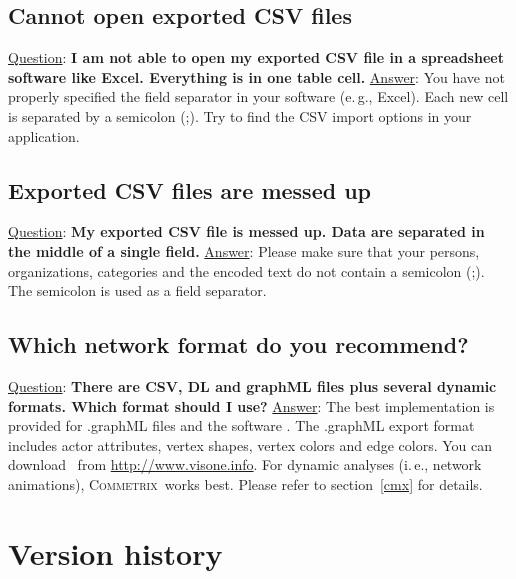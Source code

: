 \documentclass[12pt,a4paper]{scrreprt}
\newcommand{\visone}
{\textsf%
 {\protect\raisebox{.5ex}{\color[rgb]{0.1,0.1,0.1}v}%
  \protect\raisebox{.1ex}{\color[rgb]{0.3,0.3,0.3}i}%
  \protect\raisebox{-.1ex}{\color[rgb]{0.1,0.1,0.1}s}%
  \protect\raisebox{.1ex}{\color[rgb]{0.3,0.3,0.3}o}%
  \protect\raisebox{-.1ex}{\color[rgb]{0.1,0.1,0.1}n}%
  \protect\raisebox{-.4ex}{\color[rgb]{0.3,0.3,0.3}e}%
 }%
}
\newcommand{\commetrix}{\textsc{Commetrix}}
\begin{document}
\section{Cannot open exported CSV files}
\underline{Question}: \textbf{I am not able to open my exported CSV file in a spreadsheet software like Excel. Everything is in one table cell.}
\vspace{0.3cm} \newline
\underline{Answer}: You have not properly specified the field separator in your software (e.\,g., Excel). Each new cell is separated by a semicolon (;). Try to find the CSV import options in your application.

\section{Exported CSV files are messed up}
\underline{Question}: \textbf{My exported CSV file is messed up. Data are separated in the middle of a single field.}
\vspace{0.3cm} \newline
\underline{Answer}: Please make sure that your persons, organizations, categories and the encoded text do not contain a semicolon (;). The semicolon is used as a field separator.

\section{Which network format do you recommend?}
\underline{Question}: \textbf{There are CSV, DL and graphML files plus several dynamic formats. Which format should I use?}
\vspace{0.3cm} \newline
\underline{Answer}: The best implementation is provided for .graphML files and the software \visone. The .graphML export format includes actor attributes, vertex shapes, vertex colors and edge colors. You can download \visone\ from \url{http://www.visone.info}. For dynamic analyses (i.\,e., network animations), \commetrix\ works best. Please refer to section~\ref{cmx} for details.


\chapter{Version history}
\end{document}
